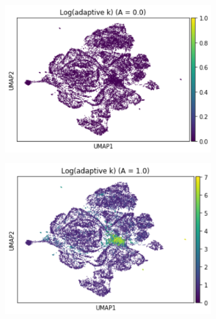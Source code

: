 \documentclass{article}
\begin{document}
\begin{figure}
    \begin{subfigure}[t]{0.32\textwidth}
    \centering
        \includegraphics[width=\linewidth]{figs/notMNIST_logadaK_Aeq0.png} 
    \end{subfigure}
    \begin{subfigure}[t]{0.32\textwidth}
        \centering
        \includegraphics[width=\linewidth]{figs/notMNIST_logadaK_Aeq1.png} 
    \end{subfigure}
    \begin{subfigure}[t]{0.32\textwidth}
        \centering

\end{subfigure}
\end{figure}
\end{document}
